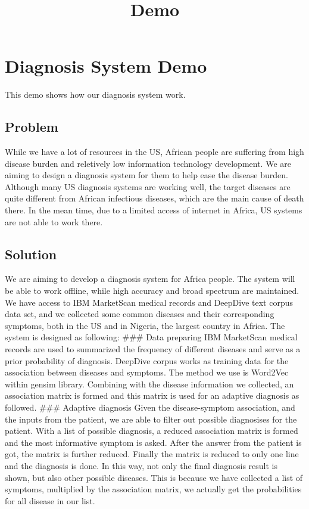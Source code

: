 \documentclass[11pt]{article}
\title{Demo}
\begin{document}
    
    
    \maketitle
    
    

    
    \hypertarget{diagnosis-system-demo}{%
\section{Diagnosis System Demo}\label{diagnosis-system-demo}}

This demo shows how our diagnosis system work.

\hypertarget{problem}{%
\subsection{Problem}\label{problem}}

While we have a lot of resources in the US, African people are suffering
from high disease burden and reletively low information technology
development. We are aiming to design a diagnosis system for them to help
ease the disease burden. Although many US diagnosis systems are working
well, the target diseases are quite different from African infectious
diseases, which are the main cause of death there. In the mean time, due
to a limited access of internet in Africa, US systems are not able to
work there.

\hypertarget{solution}{%
\subsection{Solution}\label{solution}}

We are aiming to develop a diagnosis system for Africa people. The
system will be able to work offline, while high accuracy and broad
spectrum are maintained. We have access to IBM MarketScan medical
records and DeepDive text corpus data set, and we collected some common
diseases and their corresponding symptoms, both in the US and in
Nigeria, the largest country in Africa. The system is designed as
following: \#\#\# Data preparing IBM MarketScan medical records are used
to summarized the frequency of different diseases and serve as a prior
probability of diagnosis. DeepDive corpus works as training data for the
association between diseases and symptoms. The method we use is Word2Vec
within gensim library. Combining with the disease information we
collected, an association matrix is formed and this matrix is used for
an adaptive diagnosis as followed. \#\#\# Adaptive diagnosis Given the
disease-symptom association, and the inputs from the patient, we are
able to filter out possible diagnosises for the patient. With a list of
possible diagnosis, a reduced association matrix is formed and the most
informative symptom is asked. After the answer from the patient is got,
the matrix is further reduced. Finally the matrix is reduced to only one
line and the diagnosis is done. In this way, not only the final
diagnosis result is shown, but also other possible diseases. This is
because we have collected a list of symptoms, multiplied by the
association matrix, we actually get the probabilities for all disease in
our list.
\end{document}
